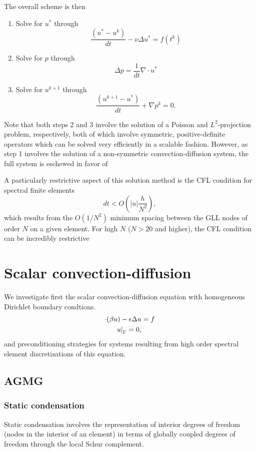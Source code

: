 \documentclass[final,leqno]{siamltex}
\newcommand{\LRp}[1]{\left( #1 \right)}
\newcommand{\LRb}[1]{\left| #1 \right|}
\let\grad\relax
\newcommand{\grad}{\nabla}
\renewcommand{\div}{\grad \cdot}
\begin{document}
The overall scheme is then 
\begin{enumerate}
\item Solve for $u^*$ through $$\frac{(u^*-u^k)}{dt} - \nu\Delta u^* = f(t^k)$$
\item  Solve for $p$ through $$\Delta p = \frac{1}{dt}\nabla \cdot u^*$$
\item Solve for $u^{k+1}$ through $$\frac{(u^{k+1}-u^*)}{dt} + \nabla p^k = 0.$$
\end{enumerate}
Note that both steps 2 and 3 involve the solution of a Poisson and $L^2$-projection problem, respectively, both of which involve symmetric, positive-definite operators which can be solved very efficiently in a scalable fashion.  However, as step 1 involves the solution of a non-symmetric convection-diffusion system, the full system is eschewed in favor of 

A particularly restrictive aspect of this solution method is the CFL condition for spectral finite elements
\[
dt < O\LRp{\LRb{u}\frac{h}{N^2}},
\]
which results from the $O(1/N^2)$ minimum spacing between the GLL nodes of order $N$ on a given element.  For high $N$ ($N>20$ and higher), the CFL condition can be incredibly restrictive 

\section{Scalar convection-diffusion}

We investigate first the scalar convection-diffusion equation with homogeneous Dirichlet boundary condtions.  
\begin{align*}
\div(\beta u) - \epsilon \Delta u &= f\\
\left.u\right|_{\Gamma} = 0,
\end{align*}
and preconditioning strategies for systems resulting from high order spectral element discretizations of this equation.  

\subsection{AGMG}

\subsubsection{Static condensation}

Static condensation involves the representation of interior degrees of freedom (nodes in the interior of an element) in terms of globally coupled degrees of freedom through the local Schur complement.  
\end{document}
